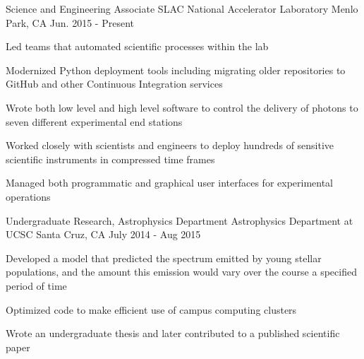 \begin{cventries}
  \cventry
    {Science and Engineering Associate}
    {SLAC National Accelerator Laboratory}
    {Menlo Park, CA}
    {Jun. 2015 - Present}
    {
      \begin{cvitems}
        \item {Led teams that automated scientific processes within the lab}
        \item {Modernized Python deployment tools including migrating older
               repositories to GitHub and other Continuous Integration
               services}
        \item {Wrote both low level and high level software to control the
               delivery of photons to seven different experimental end stations}
        \item {Worked closely with scientists and engineers to deploy hundreds
               of sensitive scientific instruments in compressed time frames}
        \item {Managed both programmatic and graphical user interfaces for
               experimental operations} 
    \end{cvitems}
    }
  \cventry
    {Undergraduate Research, Astrophysics Department}
    {Astrophysics Department at UCSC}
    {Santa Cruz, CA}
    {July 2014 - Aug 2015}
    {
      \begin{cvitems}
        \item {Developed a model that predicted the spectrum emitted by young
               stellar populations, and the amount this emission would vary
               over the course a specified period of time}
        \item {Optimized code to make efficient use of campus computing
               clusters}
        \item {Wrote an undergraduate thesis and later contributed to a
               published scientific paper}
      \end{cvitems}
      }
\end{cventries}
